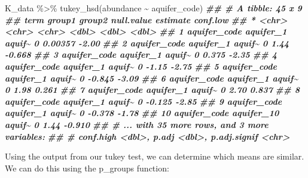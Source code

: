 \documentclass[
]{krantz}
\newenvironment{Shaded}{\begin{snugshade}}{\end{snugshade}}
\newcommand{\DocumentationTok}[1]{\textcolor[rgb]{0.56,0.35,0.01}{\textbf{\textit{#1}}}}
\newcommand{\FunctionTok}[1]{\textcolor[rgb]{0.00,0.00,0.00}{#1}}
\newcommand{\NormalTok}[1]{#1}
\newcommand{\SpecialCharTok}[1]{\textcolor[rgb]{0.00,0.00,0.00}{#1}}
\begin{document}
\begin{Shaded}
\begin{Highlighting}[]
\NormalTok{K\_data }\SpecialCharTok{\%\textgreater{}\%}
  \FunctionTok{tukey\_hsd}\NormalTok{(abundance }\SpecialCharTok{\textasciitilde{}}\NormalTok{ aquifer\_code)}
\DocumentationTok{\#\# \# A tibble: 45 x 9}
\DocumentationTok{\#\#    term         group1     group2 null.value estimate conf.low}
\DocumentationTok{\#\#  * \textless{}chr\textgreater{}        \textless{}chr\textgreater{}      \textless{}chr\textgreater{}       \textless{}dbl\textgreater{}    \textless{}dbl\textgreater{}    \textless{}dbl\textgreater{}}
\DocumentationTok{\#\#  1 aquifer\_code aquifer\_1  aquif\textasciitilde{}          0  0.00357   {-}2.00 }
\DocumentationTok{\#\#  2 aquifer\_code aquifer\_1  aquif\textasciitilde{}          0  1.44      {-}0.668}
\DocumentationTok{\#\#  3 aquifer\_code aquifer\_1  aquif\textasciitilde{}          0  0.375     {-}2.35 }
\DocumentationTok{\#\#  4 aquifer\_code aquifer\_1  aquif\textasciitilde{}          0 {-}1.15      {-}2.75 }
\DocumentationTok{\#\#  5 aquifer\_code aquifer\_1  aquif\textasciitilde{}          0 {-}0.845     {-}3.09 }
\DocumentationTok{\#\#  6 aquifer\_code aquifer\_1  aquif\textasciitilde{}          0  1.98       0.261}
\DocumentationTok{\#\#  7 aquifer\_code aquifer\_1  aquif\textasciitilde{}          0  2.70       0.837}
\DocumentationTok{\#\#  8 aquifer\_code aquifer\_1  aquif\textasciitilde{}          0 {-}0.125     {-}2.85 }
\DocumentationTok{\#\#  9 aquifer\_code aquifer\_1  aquif\textasciitilde{}          0 {-}0.378     {-}1.78 }
\DocumentationTok{\#\# 10 aquifer\_code aquifer\_10 aquif\textasciitilde{}          0  1.44      {-}0.910}
\DocumentationTok{\#\# \# ... with 35 more rows, and 3 more variables:}
\DocumentationTok{\#\# \#   conf.high \textless{}dbl\textgreater{}, p.adj \textless{}dbl\textgreater{}, p.adj.signif \textless{}chr\textgreater{}}
\end{Highlighting}
\end{Shaded}

Using the output from our tukey test, we can determine which means are similar. We can do this using the p\_groups function:
\end{document}
